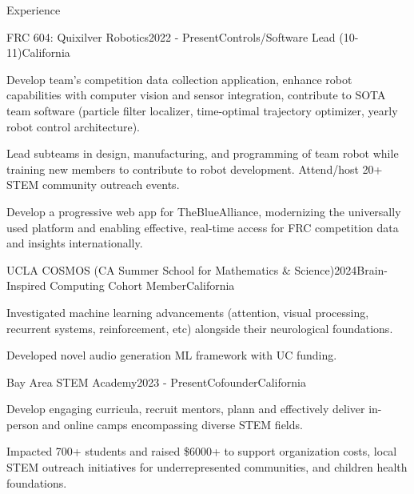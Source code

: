 \documentclass[
  10pt, %
]{resume} %
\begin{document}
\sloppy


\begin{rSection}{Experience}


  \begin{rSubsection}{FRC 604: Quixilver Robotics}{2022 - Present}{Controls/Software Lead (10-11)}{California}
    
    \item Develop team's competition data collection application, enhance robot capabilities with computer vision and sensor integration, contribute to SOTA team software (particle filter localizer, time-optimal trajectory optimizer, yearly robot control architecture).
    
    \item Lead subteams in design, manufacturing, and programming of team robot while training new members to contribute to robot development. Attend/host 20+ STEM community outreach events.
    
    \item Develop a progressive web app for TheBlueAlliance, modernizing the universally used platform and enabling effective, real-time access for FRC competition data and insights internationally.
    
  \end{rSubsection}
        
  \begin{rSubsection}{UCLA COSMOS (CA Summer School for Mathematics \& Science)}{2024}{Brain-Inspired Computing Cohort Member}{California}
    
    \item Investigated machine learning advancements (attention, visual processing, recurrent systems, reinforcement, etc) alongside their neurological foundations.
    
    \item Developed novel audio generation ML framework with UC funding.
    
  \end{rSubsection}
        
  \begin{rSubsection}{Bay Area STEM Academy}{2023 - Present}{Cofounder}{California}
    
    \item Develop engaging curricula, recruit mentors, plann and effectively deliver in-person and online camps encompassing diverse STEM fields.
    
    \item Impacted 700+ students and raised \$6000+ to support organization costs, local STEM outreach initiatives for underrepresented communities, and children health foundations.
    
  \end{rSubsection}
        
	
\end{rSection}
\end{document}
